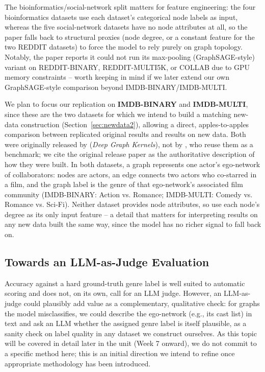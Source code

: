 \documentclass[11pt]{article}
\begin{document}
The bioinformatics/social-network split matters for feature engineering: the four bioinformatics datasets use each dataset's categorical node labels as input, whereas the five social-network datasets have no node attributes at all, so the paper falls back to structural proxies (node degree, or a constant feature for the two REDDIT datasets) to force the model to rely purely on graph topology. Notably, the paper reports it could not run its max-pooling (GraphSAGE-style) variant on REDDIT-BINARY, REDDIT-MULTI5K, or COLLAB due to GPU memory constraints -- worth keeping in mind if we later extend our own GraphSAGE-style comparison beyond IMDB-BINARY/IMDB-MULTI.

We plan to focus our replication on \textbf{IMDB-BINARY} and \textbf{IMDB-MULTI}, since these are the two datasets for which we intend to build a matching new-data construction (Section~\ref{sec:newdata2}), allowing a direct, apples-to-apples comparison between replicated original results and results on new data. Both were originally released by \citet{yanardag2015deep} (\textit{Deep Graph Kernels}), not by \citet{xu2019gin}, who reuse them as a benchmark; we cite the original release paper as the authoritative description of how they were built. In both datasets, a graph represents one actor's ego-network of collaborators: nodes are actors, an edge connects two actors who co-starred in a film, and the graph label is the genre of that ego-network's associated film community (IMDB-BINARY: Action vs. Romance; IMDB-MULTI: Comedy vs. Romance vs. Sci-Fi). Neither dataset provides node attributes, so \citet{xu2019gin} use each node's degree as its only input feature -- a detail that matters for interpreting results on any new data built the same way, since the model has no richer signal to fall back on.

\subsection{Towards an LLM-as-Judge Evaluation}
Accuracy against a hard ground-truth genre label is well suited to automatic scoring and does not, on its own, call for an LLM judge. However, an LLM-as-judge could plausibly add value as a complementary, qualitative check: for graphs the model misclassifies, we could describe the ego-network (e.g., its cast list) in text and ask an LLM whether the assigned genre label is itself plausible, as a sanity check on label quality in any dataset we construct ourselves. As this topic will be covered in detail later in the unit (Week 7 onward), we do not commit to a specific method here; this is an initial direction we intend to refine once appropriate methodology has been introduced.
\end{document}
